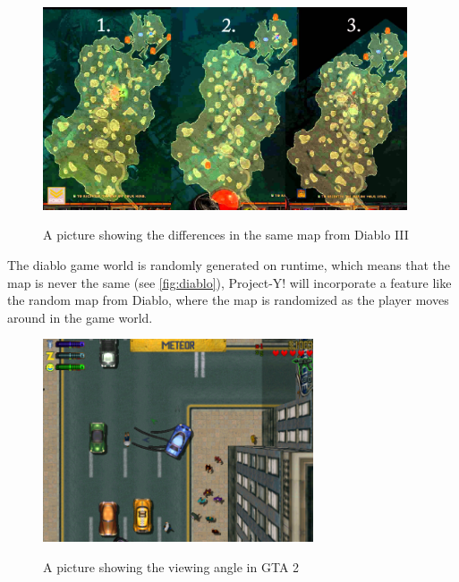 \documentclass[../main.tex]{subfiles}
\begin{document}
\begin{figure}[H]
	\centering
	\caption{A picture showing the differences in the same map from Diablo III}
	\includegraphics[height=6cm]{images/diabloMap}
	\label{fig:diablo}
\end{figure}

The diablo game world is randomly generated on runtime, which means that the map is never the same (see \autoref{fig:diablo}), Project-Y! will incorporate a feature like the random map from Diablo, where the map is randomized as the player moves around in the game world.\\
\begin{figure}[H]
	\centering
	\caption{A picture showing the viewing angle in GTA 2}
\includegraphics[height=6cm]{images/gta2.png}
	\label{fig:gta2}
\end{figure}
\end{document}
